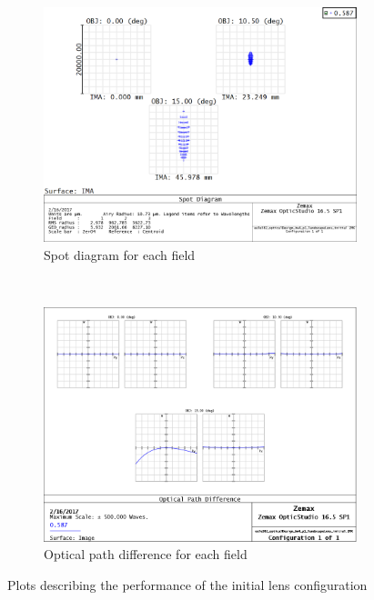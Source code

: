 \documentclass[10pt,a4paper]{article}
\begin{document}
		\begin{figure}[H]
			\centering
			\begin{subfigure}[t]{0.5\textwidth}
				\centering
				\includegraphics[width=\textwidth]{../zemax/1_initial/spot}
				\caption{Spot diagram for each field}
				\label{spot_init}
			\end{subfigure}%
			~ 
			\begin{subfigure}[t]{0.5\textwidth}
				\centering
				\includegraphics[width=\textwidth]{../zemax/1_initial/fan}
				\caption{Optical path difference for each field}
			\end{subfigure}
			\caption{Plots describing the performance of the initial lens configuration}
		\end{figure}
		
\end{document}
